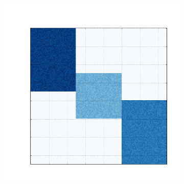 \documentclass[10pt]{beamer}
\begin{document}
\begin{frame}
\begin{figure} [htpb]
\begin{subfigure}[b]{0.16\textwidth}
          \caption{}
          \label{fig:bic-syntetic-structure:d}
      \end{subfigure}
      ~
      \begin{subfigure}[b]{0.16\textwidth}
          \includegraphics[width=\textwidth]{img/e-bic-structure.png}
          \caption{}
          \label{fig:bic-syntetic-structure:e}
      \end{subfigure}
      \label{fig:bic-syntetic-structure}
  \end{figure}


\end{frame}
\end{document}
